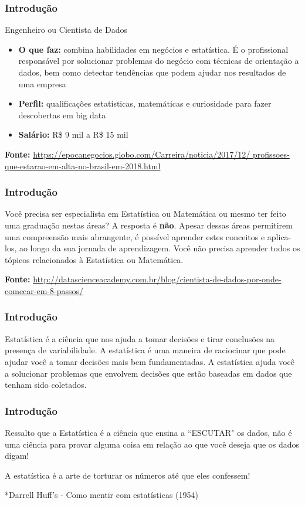 \documentclass[14pt,aspectratio=1610]{beamer}
\begin{document}
\begin{frame}{}
\frametitle{Introdução}
\begin{block}{Engenheiro ou Cientista de Dados}
\justifying
\begin{itemize}
\item {\bf O que faz:} combina habilidades em negócios e estatística. É o profissional responsável por solucionar problemas do negócio com técnicas de orientação a dados, bem como detectar tendências que podem ajudar nos resultados de uma empresa
\item {\bf Perfil:} qualificações estatísticas, matemáticas e curiosidade para fazer descobertas em big data
\item {\bf Salário:} R\$ 9 mil a R\$ 15 mil\\
\end{itemize}
{\bf Fonte:} \url{https://epocanegocios.globo.com/Carreira/noticia/2017/12/
profissoes-que-estarao-em-alta-no-brasil-em-2018.html}
\end{block}
\end{frame}

\begin{frame}{}
\frametitle{Introdução}
\begin{block}{}
\justifying
Você precisa ser especialista em Estatística ou Matemática ou mesmo ter feito uma graduação nestas áreas? \pause A resposta é {\bf não}. \pause Apesar dessas áreas permitirem uma compreensão mais abrangente, é possível aprender estes conceitos e aplica-los, ao longo da sua jornada de aprendizagem. Você não precisa aprender todos os tópicos relacionados à Estatística ou Matemática.

{\bf Fonte:} \url{http://datascienceacademy.com.br/blog/cientista-de-dados-por-onde-comecar-em-8-passos/}
\end{block}
\end{frame}

\begin{frame}{}
\frametitle{Introdução}
\begin{block}{}
\justifying
Estatística é a ciência que nos ajuda a tomar decisões e tirar conclusões na presença de variabilidade. A estatística é uma maneira de raciocinar que pode ajudar você a tomar decisões mais bem fundamentadas. A estatística ajuda você a solucionar problemas que envolvem decisões que estão baseadas em dados que tenham sido coletados.
\end{block}
\end{frame}

\begin{frame}{}
\frametitle{Introdução}
\begin{block}{}
\justifying
Ressalto que a Estatística é a ciência que ensina a ``ESCUTAR" os dados, não é uma ciência para provar alguma coisa em relação ao que você deseja que os dados digam!
\end{block}
\pause
\begin{block}{}
\justifying
A estatística é a arte de torturar os números até que eles confessem!

*Darrell Huff's - Como mentir com estatísticas (1954)
\end{block}
\end{frame}
\end{document}
